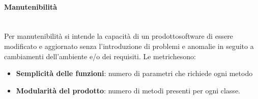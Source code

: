 	\paragraph{Manutenibilità} \mbox{}\\[1mm]
	Per manutenibilità si intende la capacità di un prodotto\glosp software di essere modificato e aggiornato senza l'introduzione di problemi e anomalie in seguito a cambiamenti dell'ambiente e/o dei requisiti.
	Le metriche\glosp sono:
	\begin{itemize}
		\item \textbf{Semplicità delle funzioni}: numero di parametri che richiede ogni metodo
		\item \textbf{Modularità del prodotto}\glo: numero di metodi presenti per ogni classe.
	\end{itemize}
